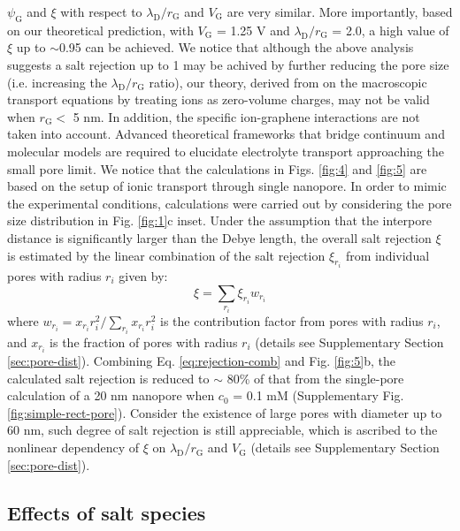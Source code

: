 \documentclass[journal=langd5,email=true, hyperref=true, keywords=false]{achemso}
\begin{document}
$\psi_{\mathrm{G}}$ and $\xi$ with respect to
$\lambda_{\mathrm{D}}/r_{\mathrm{G}}$ and $V_{\mathrm{G}}$ are very
similar. More importantly, based on our theoretical prediction, with
$V_{\mathrm{G}}$ = 1.25 V and $\lambda_{\mathrm{D}} / r_{\mathrm{G}}$
= { 2.0},
a high value of $\xi$ up to $\sim$0.95 can be achieved.  We
notice that although the above analysis suggests a salt rejection up
to 1 may be achived by further reducing the pore size (i.e. increasing
the $\lambda_{\mathrm{D}}/r_{\mathrm{G}}$ ratio), our theory, derived
from on the macroscopic transport equations by treating ions as
zero-volume charges, may not be valid when $r_{\mathrm{G}}<$ 5
nm\cite{Jain_2015}. In addition, the specific ion-graphene
interactions \cite{Rollings_2016} are not taken into account. Advanced
theoretical frameworks that bridge continuum and molecular models are
required to elucidate electrolyte transport approaching the small pore
limit. 
{
We notice that the calculations in Figs. \ref{fig:4} and \ref{fig:5} 
are based on the setup  of ionic transport through single nanopore.
In order to mimic the experimental conditions, 
calculations were carried out by considering the pore size distribution in Fig. \ref{fig:1}c inset. 
Under the assumption that the interpore distance is significantly larger than the Debye length,
the overall salt rejection $\xi$ is
estimated by the linear combination of the salt rejection 
$\xi_{r_i}$ 
from individual pores with radius $r_i$ given by:
\begin{equation}
\label{eq:rejection-comb}
\xi = \sum_{r_{i}} \xi_{r_{i}} w_{r_{i}}
\end{equation}
where
$w_{r_{i}} = x_{r_{i}} r_{i}^{2} / \sum_{r_{i}} x_{r_{i}} r_{i}^{2} $
is the contribution factor from pores with radius $r_{i}$, and
$x_{r_{i}}$ is the fraction of pores with radius
$r_{i}$ (details see Supplementary Section
\ref{sec:pore-dist}). Combining Eq. \ref{eq:rejection-comb} and
Fig. \ref{fig:5}b, the
calculated salt rejection is reduced to $\sim{}$ 80\% of that from the
single-pore calculation of a 20 nm nanopore when $c_{0}$ = 0.1 mM (Supplementary Fig.
\ref{fig:simple-rect-pore}). Consider the existence of large pores
with diameter up to 60 nm, such degree of salt rejection is still
appreciable, which is ascribed to the nonlinear dependency of $\xi$ on
$\lambda_{\mathrm{D}} / r_{\mathrm{G}}$ and $V_{\mathrm{G}}$ (details
see Supplementary Section \ref{sec:pore-dist}).}

\subsection*{Effects of salt species}
\label{sec:salts}
\end{document}
